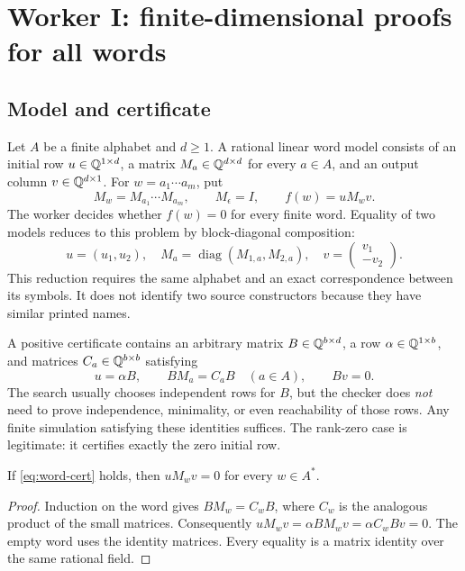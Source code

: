 \section{Worker I: finite-dimensional proofs for all words}
\label{sec:words}

\subsection{Model and certificate}

Let $A$ be a finite alphabet and $d\ge1$. A rational linear word model consists of
an initial row $u\in\mathbb Q^{1\times d}$, a matrix $M_a\in\mathbb Q^{d\times d}$ for every
$a\in A$, and an output column $v\in\mathbb Q^{d\times1}$. For
$w=a_1\cdots a_m$, put
\[
M_w=M_{a_1}\cdots M_{a_m},\qquad M_\epsilon=I,
\qquad f(w)=uM_wv.
\]
The worker decides whether $f(w)=0$ for every finite word. Equality of two models
reduces to this problem by block-diagonal composition:
\[
u=(u_1,u_2),\quad M_a=\operatorname{diag}(M_{1,a},M_{2,a}),\quad
v=\begin{pmatrix}v_1\\-v_2\end{pmatrix}.
\]
This reduction requires the same alphabet and an exact correspondence between
its symbols. It does not identify two source constructors because they have
similar printed names.

A positive certificate contains an arbitrary matrix $B\in\mathbb Q^{b\times d}$,
a row $\alpha\in\mathbb Q^{1\times b}$, and matrices
$C_a\in\mathbb Q^{b\times b}$ satisfying
\begin{equation}\label{eq:word-cert}
u=\alpha B,\qquad BM_a=C_aB\quad(a\in A),\qquad Bv=0.
\end{equation}
The search usually chooses independent rows for $B$, but the checker does
\emph{not} need to prove independence, minimality, or even reachability of those
rows. Any finite simulation satisfying these identities suffices. The rank-zero
case is legitimate: it certifies exactly the zero initial row.

\begin{theorem}\label{thm:word-sound}
If \eqref{eq:word-cert} holds, then $uM_wv=0$ for every $w\in A^*$.
\end{theorem}
\begin{proof}
Induction on the word gives $BM_w=C_wB$, where $C_w$ is the analogous product
of the small matrices. Consequently
$uM_wv=\alpha BM_wv=\alpha C_wBv=0$. The empty word uses the identity matrices.
Every equality is a matrix identity over the same rational field.
\end{proof}

